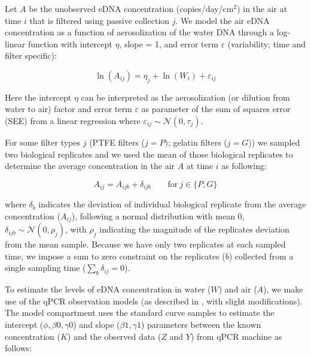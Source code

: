 \documentclass{article}
\begin{document}
Let $A$ be the unobserved eDNA concentration (copies/day/cm$^2$) in the air at time $i$ that is filtered using passive collection $j$. We model the air eDNA concentration as a function of aerosolization of the water DNA through a log-linear function with intercept $\eta$, slope = 1, and error term $\varepsilon$ (variability; time and filter specific):

\begin{equation}
\ln(A_{ij}) = \eta_{j} + \ln(W_{i}) + \varepsilon_{ij}
\end{equation}

Here the intercept $\eta$ can be interpreted as the aerosolization (or dilution from water to air) factor and error term $\varepsilon$ as parameter of the sum of squares error (SEE) from a linear regression where $\varepsilon_{ij} \sim \mathcal{N}(0,\tau_j)$.

For some filter types $j$ (PTFE filters (${j=P})$; gelatin filters (${j=G}$)) we sampled two biological replicates and we used the mean of those biological replicates to determine the average concentration in the air $A$ at time $i$ as following:

\begin{equation}
A_{ij} = A_{ijb} + \delta_{ijb} \qquad \text{for} \ j \in \{P,G\}
\end{equation}


where $\delta_b$ indicates the deviation of individual biological replicate from the average concentration ($A_{ij}$), following a normal distribution with mean 0, $\delta_{ijb} \sim \mathcal{N}(0,\rho_j)$, with $\rho_j$ indicating the magnitude of the replicates deviation from the mean sample. Because we have only two replicates at each sampled time, we impose a sum to zero constraint on the replicates ($b$) collected from a single sampling time ($\sum_b \delta_{ij} = 0$).

To estimate the levels of eDNA concentration in water ($W$) and air ($A$), we make use of the qPCR observation models (as described in \cite{guri2024, shelton2022}, with slight modifications). The model compartment uses the standard curve samples to estimate the intercept ($\phi,\beta0,\gamma0$) and slope ($\beta1, \gamma1$) parameters between the known concentration ($K$) and the observed data ($Z$ and $Y$) from qPCR machine as follows:
\end{document}
